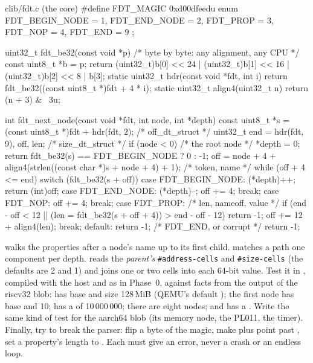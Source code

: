 \documentclass[11pt,a4paper]{article}
\begin{document}
\begin{lst}{c}{lib/fdt.c (the core)}
#define FDT_MAGIC 0xd00dfeedu
enum { FDT_BEGIN_NODE = 1, FDT_END_NODE = 2, FDT_PROP = 3, FDT_NOP = 4, FDT_END = 9 };

uint32_t fdt_be32(const void *p)                 /* byte by byte: any alignment, any CPU */
{
    const uint8_t *b = p;
    return (uint32_t)b[0] << 24 | (uint32_t)b[1] << 16 | (uint32_t)b[2] << 8 | b[3];
}
static uint32_t hdr(const void *fdt, int i) { return fdt_be32((const uint8_t *)fdt + 4 * i); }
static uint32_t align4(uint32_t n) { return (n + 3) & ~3u; }

int fdt_next_node(const void *fdt, int node, int *depth)
{
    const uint8_t *s = (const uint8_t *)fdt + hdr(fdt, 2);   /* off_dt_struct  */
    uint32_t end = hdr(fdt, 9), off, len;                    /* size_dt_struct */
    if (node < 0) {                                          /* the root node  */
        *depth = 0;
        return fdt_be32(s) == FDT_BEGIN_NODE ? 0 : -1;
    }
    off = node + 4 + align4(strlen((const char *)s + node + 4) + 1);   /* token, name */
    while (off + 4 <= end) {
        switch (fdt_be32(s + off)) {
        case FDT_BEGIN_NODE: (*depth)++; return (int)off;
        case FDT_END_NODE:   (*depth)--; off += 4; break;
        case FDT_NOP:        off += 4; break;
        case FDT_PROP:                                       /* len, nameoff, value */
            if (end - off < 12 || (len = fdt_be32(s + off + 4)) > end - off - 12)
                return -1;
            off += 12 + align4(len);
            break;
        default:             return -1;                      /* FDT_END, or corrupt */
        }
    }
    return -1;
}
\end{lst}

 walks the properties after a node's name up to its first child.  matches a
path one component per depth.  reads the \emph{parent's} \texttt{\#address-cells} and
\texttt{\#size-cells} (the defaults are 2 and 1) and joins one or two cells into each 64-bit value. Test it in
, compiled with the host  and  as in Phase~0,
against facts from the  output of the riscv32 blob:  has base  and
size 128\,MiB (QEMU's default ); the first  node has base  and
 10;  has a  of 10\,000\,000; there are eight
 nodes; and  has a . Write the same kind of test for the aarch64 blob
(its memory node, the PL011, the timer). Finally, try to break the parser: flip a byte of the magic, make
 plus  point past , set a property's length to
. Each must give an error, never a crash or an endless loop.
\end{document}
